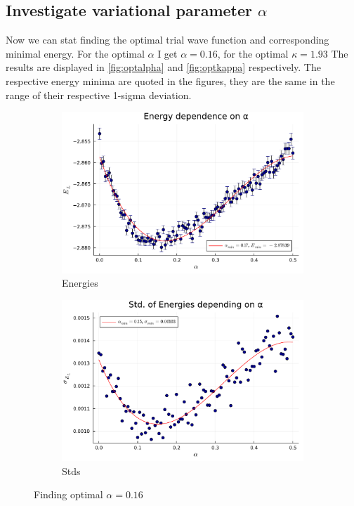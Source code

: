 \documentclass[
	a4paper, %
	10pt, %
]{CSUniSchoolLabReport}
\begin{document}
\subsection{Investigate variational parameter $\alpha$}

Now we can stat finding the optimal trial wave function and corresponding minimal energy. For the optimal $\alpha$ I get $\alpha=0.16$, for the optimal $\kappa=1.93$ The results are displayed in \autoref{fig:optalpha} and \autoref{fig:optkappa} respectively. The respective energy minima are quoted in the figures, they are the same in the range of their respective 1-sigma deviation.

\begin{figure}[H]
	\begin{subfigure}[b]{0.49\textwidth}
		\centering
		\includegraphics[width=\textwidth]{../saves/task1c.avEnergies.pdf}
		\caption{Energies}
	\end{subfigure}
	\hfill
	\begin{subfigure}[b]{0.49\textwidth}
		\centering
		\includegraphics[width=\textwidth]{../saves/task1c.avStd.pdf}
		\caption{Stds}
	\end{subfigure}
	\caption{Finding optimal $\alpha=0.16$}
	\label{fig:optalpha}
\end{figure}
\end{document}

